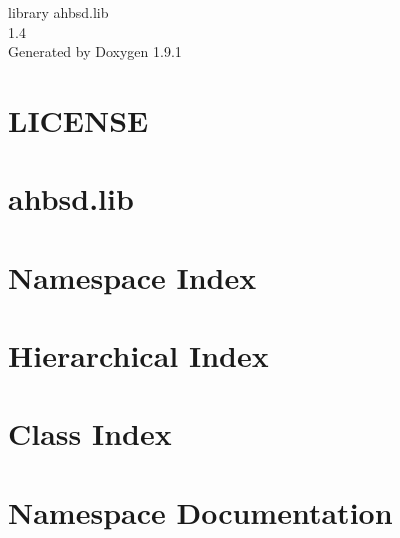 \let\mypdfximage\pdfximage\def\pdfximage{\immediate\mypdfximage}\documentclass[twoside]{book}
\newcommand{\+}{\discretionary{\mbox{\scriptsize$\hookleftarrow$}}{}{}}
\newcommand{\clearemptydoublepage}{%
  \newpage{\pagestyle{empty}\cleardoublepage}%
}
\begin{document}
\raggedbottom

\hypersetup{pageanchor=false,
             bookmarksnumbered=true,
             pdfencoding=unicode
            }
\begin{titlepage}
\vspace*{7cm}
\begin{center}%
{\Large library ahbsd.\+lib \\[1ex]\large 1.\+4 }\\
\vspace*{1cm}
{\large Generated by Doxygen 1.9.1}\\
\end{center}
\end{titlepage}
\clearemptydoublepage
{}
\tableofcontents
\clearemptydoublepage
{}
\hypersetup{pageanchor=true}

\chapter{LICENSE}
\label{md_LICENSE}

\chapter{ahbsd.\+lib}
\label{md_README}

\chapter{Namespace Index}

\chapter{Hierarchical Index}

\chapter{Class Index}

\chapter{Namespace Documentation}










\end{document}

